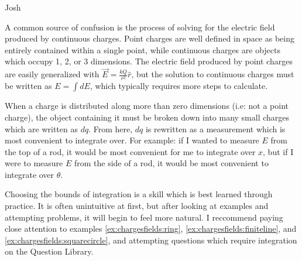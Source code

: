 \begin{studentOpinion}{Josh}
	
	A common source of confusion is the process of solving for the electric field produced by continuous charges. Point charges are well defined in space as being entirely contained within a single point, while continuous charges are objects which occupy 1, 2, or 3 dimensions. The electric field produced by point charges are easily generalized with $\vec E = \frac{kQ}{r^2}\hat r$, but the solution to continuous charges must be written as $E = \int dE$, which typically requires more steps to calculate.
	
	When a charge is distributed along more than zero dimensions (i.e: not a point charge), the object containing it must be broken down into many small charges which are written as $dq$. From here, $dq$ is rewritten as a measurement which is most convenient to integrate over. For example: if I wanted to measure $E$ from the top of a rod, it would be most convenient for me to integrate over $x$, but if I were to measure $E$ from the side of a rod, it would be most convenient to integrate over $\theta$.
	
	
	Choosing the bounds of integration is a skill which is best learned through practice. It is often unintuitive at first, but after looking at examples and attempting problems, it will begin to feel more natural. I reccommend paying close attention to examples \ref{ex:chargesfields:ring}, \ref{ex:chargesfields:finiteline}, and \ref{ex:chargesfields:squarecircle}, and attempting questions which require integration on the Question Library.
	
\end{studentOpinion}

